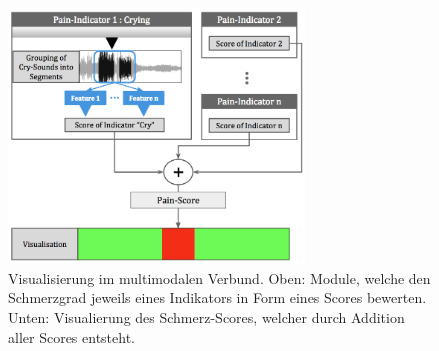 \begin{figure}[h]
	\centering
	\includegraphics[width=0.7\textwidth]{bilder/multimodal_viz_04.png}
	\caption[Visualisierung im multimodalen Verbund]{Visualisierung im multimodalen Verbund. Oben: Module, welche den Schmerzgrad jeweils eines Indikators in Form eines Scores bewerten. Unten: Visualierung des Schmerz-Scores, welcher durch Addition aller Scores entsteht. }
	\label{img:multimodal-overview}
\end{figure}



